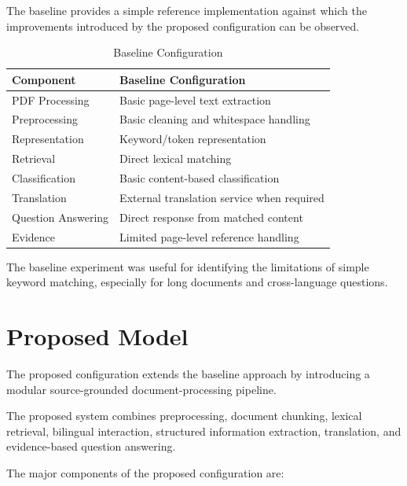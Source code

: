 The baseline provides a simple reference implementation against which
the improvements introduced by the proposed configuration can be
observed.

\begin{table}[H]
\centering
\caption{Baseline Configuration}
\begin{tabular}{|p{5cm}|p{8cm}|}
\hline
\textbf{Component} & \textbf{Baseline Configuration} \\
\hline
PDF Processing & Basic page-level text extraction \\
\hline
Preprocessing & Basic cleaning and whitespace handling \\
\hline
Representation & Keyword/token representation \\
\hline
Retrieval & Direct lexical matching \\
\hline
Classification & Basic content-based classification \\
\hline
Translation & External translation service when required \\
\hline
Question Answering & Direct response from matched content \\
\hline
Evidence & Limited page-level reference handling \\
\hline
\end{tabular}
\end{table}

The baseline experiment was useful for identifying the limitations of
simple keyword matching, especially for long documents and
cross-language questions.

\section{Proposed Model}

The proposed configuration extends the baseline approach by
introducing a modular source-grounded document-processing pipeline.

The proposed system combines preprocessing, document chunking,
lexical retrieval, bilingual interaction, structured information
extraction, translation, and evidence-based question answering.

The major components of the proposed configuration are:

